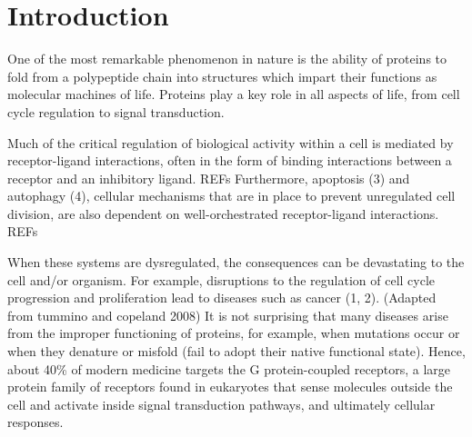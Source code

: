 \chapter{Introduction}



One of the most remarkable phenomenon in nature is the ability of proteins to fold from a polypeptide chain into structures which impart their functions as molecular machines of life. Proteins play a key role in all aspects of life, from cell cycle regulation to signal transduction. 

Much of the critical regulation of biological activity within a cell is mediated by receptor-ligand interactions, often in the form of binding interactions between a receptor and an inhibitory ligand. REFs
Furthermore, apoptosis (3) and autophagy (4), cellular mechanisms that are in place to prevent unregulated cell division, are also dependent on well-orchestrated receptor-ligand interactions. REFs

When these systems are dysregulated, the consequences can be devastating to the cell and/or organism. For example, disruptions to the regulation of cell cycle progression and proliferation lead to diseases such as cancer (1, 2). 
(Adapted from tummino and copeland 2008)
It is not surprising that many diseases arise from the improper functioning of proteins, for example, when mutations occur or when they denature or misfold (fail to adopt their native functional state). Hence, about 40\% of modern medicine targets the G protein-coupled receptors, a large protein family of receptors found in eukaryotes that sense molecules outside the cell and activate inside signal transduction pathways, and ultimately cellular responses.

